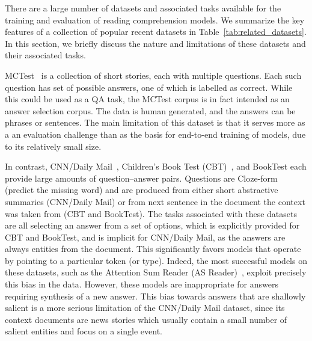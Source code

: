\documentclass[11pt,letterpaper]{article}
\begin{document}
There are a large number of datasets and associated tasks available for the training and evaluation of reading comprehension models. We summarize the key features
of a collection of popular recent datasets in Table~\ref{tab:related_datasets}. In this section, we briefly discuss the nature and limitations of these datasets and their associated tasks.

MCTest~\cite{mctest} is a collection of short stories, each with multiple questions. Each such question has set of possible answers, one of which is labelled as correct.
While this could be used as a QA task, the MCTest corpus is in fact intended as an answer selection corpus. The data is human generated, and the answers can be phrases or sentences. The main limitation of this dataset is that it serves more as a an evaluation challenge than as the basis for end-to-end training of models, due to its relatively small size.

In contrast, CNN/Daily Mail~\cite{nips15hermann}, Children's Book Test (CBT)~\cite{hill-cbt}, and BookTest \cite{booktest} each provide large amounts of question--answer pairs. Questions are Cloze-form (predict the missing word) and are produced from either short abstractive summaries (CNN/Daily Mail) or from next sentence in the document the context was taken from (CBT and BookTest). The tasks associated with these datasets are all selecting an answer from a set of options, which is explicitly provided for CBT and BookTest, and is implicit for CNN/Daily Mail, as the answers are always entities from the document.
This significantly favors models that operate by pointing to a particular token (or type). Indeed, the most successful models on these datasets, such as the Attention Sum Reader (AS Reader)~\cite{kadlec2016text}, exploit precisely this bias in the data. However, these models are inappropriate for answers requiring synthesis of a new answer. This bias towards answers that are shallowly salient is a more serious limitation of the CNN/Daily Mail dataset, since its context documents are news stories which usually contain a small number of salient entities and focus on a single event.
\end{document}
